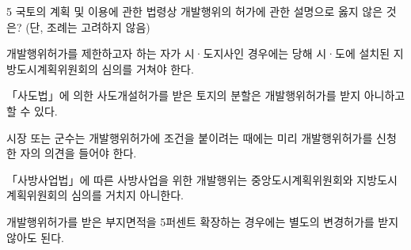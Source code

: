 \begin{question}{5}
국토의 계획 및 이용에 관한 법령상 개발행위의 허가에 관한 설명으로 옳지 않은 것은? (단, 조례는 고려하지 않음)
\begin{choices}
  \item 개발행위허가를 제한하고자 하는 자가 시·도지사인 경우에는 당해 시·도에 설치된 지방도시계획위원회의 심의를 거쳐야 한다.
  \item 「사도법」에 의한 사도개설허가를 받은 토지의 분할은 개발행위허가를 받지 아니하고 할 수 있다.
  \item 시장 또는 군수는 개발행위허가에 조건을 붙이려는 때에는 미리 개발행위허가를 신청한 자의 의견을 들어야 한다.
  \item 「사방사업법」에 따른 사방사업을 위한 개발행위는 중앙도시계획위원회와 지방도시계획위원회의 심의를 거치지 아니한다.
  \item 개발행위허가를 받은 부지면적을 5퍼센트 확장하는 경우에는 별도의 변경허가를 받지 않아도 된다.
\end{choices}
\end{question}
